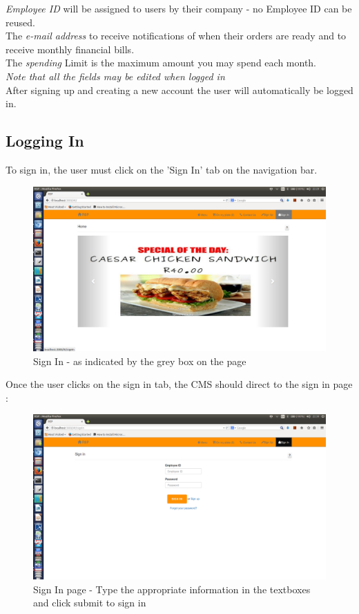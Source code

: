 \documentclass[a4paper,12pt]{report}
\begin{document}
{\em Employee ID } will be assigned to users by their company - no Employee ID can be reused.\\
The {\em e-mail address} to receive notifications of when their orders are ready and to receive monthly financial bills. \\
The {\em spending} Limit is the maximum amount you may spend each month.\\

{\em Note that all the fields may be edited when logged in} \\

After signing up and creating a new account the user will automatically be logged in. 

\subsection{Logging In}
To sign in, the user must click on the 'Sign In' tab on the navigation bar.

\begin{figure}[H]
  \centering
    \includegraphics[width=1.0\textwidth]{screenshots/sign/signIn.png}
    \caption{Sign In - as indicated by the grey box on the page} 
\end{figure}

Once the user clicks on the sign in tab, the CMS should direct to the sign in page :

\begin{figure}[H]
  \centering
    \includegraphics[width=1.0\textwidth]{screenshots/sign/signInPage.png}
    \caption{Sign In page - Type the appropriate information in the textboxes and click submit to sign in} 
\end{figure}
  
\end{document}
